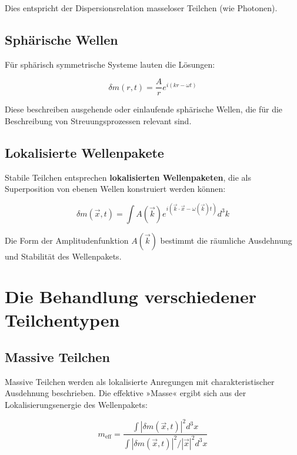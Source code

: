 \documentclass[12pt,a4paper]{report}
\begin{document}
	Dies entspricht der Dispersionsrelation masseloser Teilchen (wie Photonen).
	
	\subsection{Sphärische Wellen}
	
	Für sphärisch symmetrische Systeme lauten die Lösungen:
	
	\begin{equation}
		\delta m(r,t) = \frac{A}{r} e^{i(kr - \omega t)}
	\end{equation}
	
	Diese beschreiben ausgehende oder einlaufende sphärische Wellen, die für die Beschreibung von Streuungsprozessen relevant sind.
	
	\subsection{Lokalisierte Wellenpakete}
	
	Stabile Teilchen entsprechen \textbf{lokalisierten Wellenpaketen}, die als Superposition von ebenen Wellen konstruiert werden können:
	
	\begin{equation}
		\delta m(\vec{x},t) = \int A(\vec{k}) e^{i(\vec{k} \cdot \vec{x} - \omega(\vec{k})t)} d^3k
	\end{equation}
	
	Die Form der Amplitudenfunktion $A(\vec{k})$ bestimmt die räumliche Ausdehnung und Stabilität des Wellenpakets.
	
	\section{Die Behandlung verschiedener Teilchentypen}
	
	\subsection{Massive Teilchen}
	
	Massive Teilchen werden als lokalisierte Anregungen mit charakteristischer Ausdehnung beschrieben. Die effektive »Masse« ergibt sich aus der Lokalisierungsenergie des Wellenpakets:
	
	\begin{equation}
		m_{\text{eff}} = \frac{\int |\delta m(\vec{x},t)|^2 d^3x}{\int |\delta m(\vec{x},t)|^2 / |\vec{x}|^2 d^3x}
	\end{equation}
	
\end{document}
